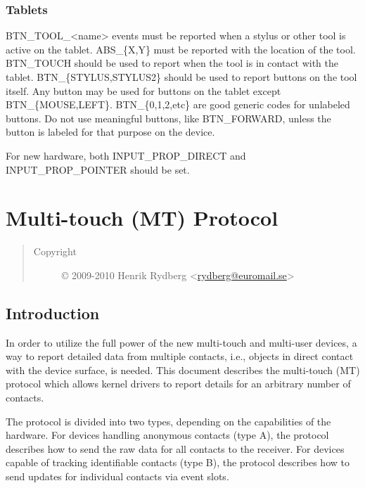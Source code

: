 \documentclass[a4paper,8pt,english]{sphinxmanual}
\begin{document}
\subsubsection{Tablets}
\label{input/event-codes:tablets}
BTN\_TOOL\_\textless{}name\textgreater{} events must be reported when a stylus or other tool is active on
the tablet. ABS\_\{X,Y\} must be reported with the location of the tool. BTN\_TOUCH
should be used to report when the tool is in contact with the tablet.
BTN\_\{STYLUS,STYLUS2\} should be used to report buttons on the tool itself. Any
button may be used for buttons on the tablet except BTN\_\{MOUSE,LEFT\}.
BTN\_\{0,1,2,etc\} are good generic codes for unlabeled buttons. Do not use
meaningful buttons, like BTN\_FORWARD, unless the button is labeled for that
purpose on the device.

For new hardware, both INPUT\_PROP\_DIRECT and INPUT\_PROP\_POINTER should be set.


\section{Multi-touch (MT) Protocol}
\label{input/multi-touch-protocol::doc}\label{input/multi-touch-protocol:multi-touch-mt-protocol}\begin{quote}\begin{description}
\item[{Copyright}] \leavevmode
© 2009-2010    Henrik Rydberg \textless{}\href{mailto:rydberg@euromail.se}{rydberg@euromail.se}\textgreater{}

\end{description}\end{quote}


\subsection{Introduction}
\label{input/multi-touch-protocol:introduction}
In order to utilize the full power of the new multi-touch and multi-user
devices, a way to report detailed data from multiple contacts, i.e.,
objects in direct contact with the device surface, is needed.  This
document describes the multi-touch (MT) protocol which allows kernel
drivers to report details for an arbitrary number of contacts.

The protocol is divided into two types, depending on the capabilities of the
hardware. For devices handling anonymous contacts (type A), the protocol
describes how to send the raw data for all contacts to the receiver. For
devices capable of tracking identifiable contacts (type B), the protocol
describes how to send updates for individual contacts via event slots.
\end{document}
